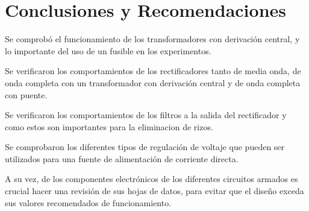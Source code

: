 \section{Conclusiones y Recomendaciones}
Se comprobó el funcionamiento de los transformadores con derivación central, y
lo importante del uso de un fusible en los experimentos.

Se verificaron los comportamientos de los rectificadores tanto de media onda, de
onda completa con un transformador con derivación central y de onda completa con
puente.

Se verificaron los comportamientos de los filtros a la salida del rectificador y
como estos son importantes para la eliminacion de rizos.

Se comprobaron los diferentes tipos de regulación de voltaje que pueden ser
utilizados para una fuente de alimentación de corriente directa.

A su vez, de los componentes electrónicos de los diferentes circuitos armados
es crucial hacer una revisión de sus hojas de datos, para evitar que el diseño
exceda sus valores recomendados de funcionamiento.

